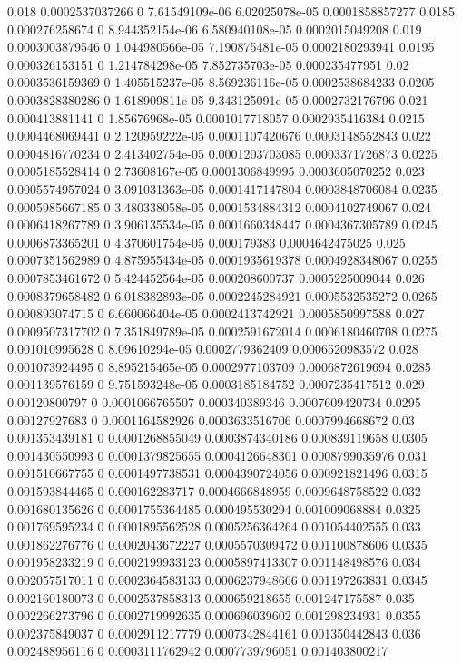 {0.018 0.0002537037266 0 7.61549109e-06 6.02025078e-05 0.0001858857277
0.0185 0.000276258674 0 8.944352154e-06 6.580940108e-05 0.0002015049208
0.019 0.0003003879546 0 1.044980566e-05 7.190875481e-05 0.0002180293941
0.0195 0.000326153151 0 1.214784298e-05 7.852735703e-05 0.000235477951
0.02 0.0003536159369 0 1.405515237e-05 8.569236116e-05 0.0002538684233
0.0205 0.0003828380286 0 1.618909811e-05 9.343125091e-05 0.0002732176796
0.021 0.000413881141 0 1.85676968e-05 0.0001017718057 0.0002935416384
0.0215 0.0004468069441 0 2.120959222e-05 0.0001107420676 0.0003148552843
0.022 0.0004816770234 0 2.413402754e-05 0.0001203703085 0.0003371726873
0.0225 0.0005185528414 0 2.73608167e-05 0.0001306849995 0.0003605070252
0.023 0.0005574957024 0 3.091031363e-05 0.0001417147804 0.0003848706084
0.0235 0.0005985667185 0 3.480338058e-05 0.0001534884312 0.0004102749067
0.024 0.0006418267789 0 3.906135534e-05 0.0001660348447 0.0004367305789
0.0245 0.0006873365201 0 4.370601754e-05 0.000179383 0.0004642475025
0.025 0.0007351562989 0 4.875955434e-05 0.0001935619378 0.0004928348067
0.0255 0.0007853461672 0 5.424452564e-05 0.000208600737 0.0005225009044
0.026 0.0008379658482 0 6.018382893e-05 0.0002245284921 0.0005532535272
0.0265 0.000893074715 0 6.660066404e-05 0.0002413742921 0.0005850997588
0.027 0.0009507317702 0 7.351849789e-05 0.0002591672014 0.0006180460708
0.0275 0.001010995628 0 8.09610294e-05 0.0002779362409 0.0006520983572
0.028 0.001073924495 0 8.895215465e-05 0.0002977103709 0.0006872619694
0.0285 0.001139576159 0 9.751593248e-05 0.0003185184752 0.0007235417512
0.029 0.00120800797 0 0.0001066765507 0.000340389346 0.0007609420734
0.0295 0.00127927683 0 0.0001164582926 0.0003633516706 0.0007994668672
0.03 0.001353439181 0 0.0001268855049 0.0003874340186 0.000839119658
0.0305 0.001430550993 0 0.0001379825655 0.0004126648301 0.0008799035976
0.031 0.001510667755 0 0.0001497738531 0.0004390724056 0.000921821496
0.0315 0.001593844465 0 0.000162283717 0.0004666848959 0.0009648758522
0.032 0.001680135626 0 0.0001755364485 0.000495530294 0.001009068884
0.0325 0.001769595234 0 0.0001895562528 0.0005256364264 0.001054402555
0.033 0.001862276776 0 0.0002043672227 0.0005570309472 0.001100878606
0.0335 0.001958233219 0 0.0002199933123 0.0005897413307 0.001148498576
0.034 0.002057517011 0 0.0002364583133 0.0006237948666 0.001197263831
0.0345 0.002160180073 0 0.0002537858313 0.000659218655 0.001247175587
0.035 0.002266273796 0 0.0002719992635 0.000696039602 0.001298234931
0.0355 0.002375849037 0 0.0002911217779 0.0007342844161 0.001350442843
0.036 0.002488956116 0 0.0003111762942 0.0007739796051 0.001403800217
}
